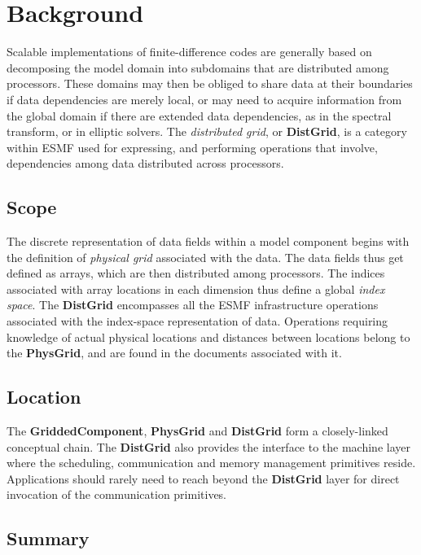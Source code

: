 
\section{Background}

Scalable implementations of finite-difference codes are generally
based on decomposing the model domain into subdomains that are
distributed among processors. These domains may then be obliged to
share data at their boundaries if data dependencies are merely
local, or may need to acquire information from the global domain if
there are extended data dependencies, as in the spectral transform, or
in elliptic solvers. The \emph{distributed grid}, or
\textbf{DistGrid}, is a category within ESMF used for expressing, and
performing operations that involve, dependencies among data
distributed across processors.

\subsection{Scope}

The discrete representation of data fields within a model component
begins with the definition of \emph{physical grid} associated with the
data. The data fields thus get defined as arrays, which are then
distributed among processors. The indices associated with array
locations in each dimension thus define a global \emph{index space}. The
\textbf{DistGrid} encompasses all the ESMF infrastructure operations
associated with the index-space representation of data. Operations
requiring knowledge of actual physical locations and distances between
locations belong to the \textbf{PhysGrid}, and are found in the
documents associated with it.

\subsection{Location}

The \textbf{GriddedComponent}, \textbf{PhysGrid} and \textbf{DistGrid}
form a closely-linked conceptual chain. The \textbf{DistGrid} also
provides the interface to the machine layer where the scheduling,
communication and memory management primitives reside. Applications
should rarely need to reach beyond the \textbf{DistGrid} layer for
direct invocation of the communication primitives.


\subsection{Summary}

